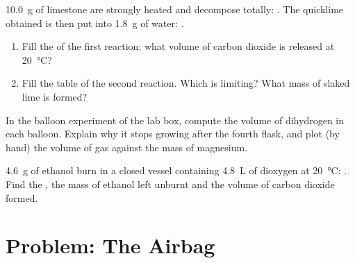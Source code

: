 \begin{exercise}[$\star\star\star$]\label{exo:g10:reaction-progress-table:13}
\qty{10.0}{g} of limestone  are strongly heated and decompose
totally: . The quicklime  obtained is then
put into \qty{1.8}{g} of water: .
\begin{enumerate}
  \item Fill the  of the first reaction; what volume of
        carbon dioxide is released at \qty{20}{\celsius}?
  \item Fill the table of the second reaction. Which  is
        limiting? What mass of slaked lime  is formed?
\end{enumerate}
\end{exercise}

\begin{exercise}[$\star\star\star$]\label{exo:g10:reaction-progress-table:14}
In the balloon experiment of the lab box, compute the volume of
dihydrogen in each balloon. Explain why it stops growing after the
fourth flask, and plot (by hand) the volume of gas against the mass of
magnesium.
\end{exercise}

\begin{exercise}[$\star\star\star$]\label{exo:g10:reaction-progress-table:15}
\qty{4.6}{g} of ethanol  burn in a closed vessel containing
\qty{4.8}{L} of dioxygen at \qty{20}{\celsius}:
. Find the , the mass of
ethanol left unburnt and the volume of carbon dioxide formed.
\end{exercise}

\section{Problem: The Airbag}

